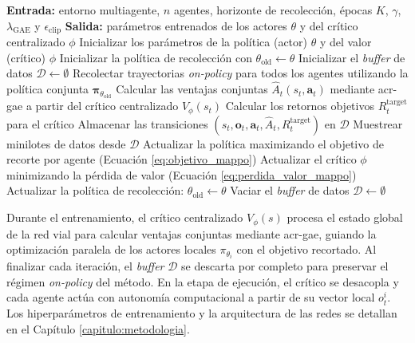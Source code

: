 \begin{algorithm}[!htbp]
\caption{Algoritmo Multi-Agent Proximal Policy Optimization (\acrshort{acr-mappo})}
\label{alg:mappo}
\begin{algorithmic}[1]
\Statex \textbf{Entrada:} entorno multiagente, $n$ agentes, horizonte de recolección, épocas $K$, $\gamma$, $\lambda_{\mathrm{GAE}}$ y $\epsilon_{\mathrm{clip}}$
\Statex \textbf{Salida:} parámetros entrenados de los actores $\theta$ y del crítico centralizado $\phi$
\State Inicializar los parámetros de la política (actor) $\theta$ y del valor (crítico) $\phi$
\State Inicializar la política de recolección con $\theta_{\mathrm{old}} \leftarrow \theta$
\State Inicializar el \textit{buffer} de datos $\mathcal{D} \leftarrow \emptyset$
    \State Recolectar trayectorias \textit{on-policy} para todos los agentes utilizando la política conjunta $\boldsymbol{\pi}_{\theta_{\mathrm{old}}}$
    \State Calcular las ventajas conjuntas $\hat{A}_t(s_t, \mathbf{a}_t)$ mediante \acrshort{acr-gae} a partir del crítico centralizado $V_\phi(s_t)$
    \State Calcular los retornos objetivos $R_t^{\text{target}}$ para el crítico
    \State Almacenar las transiciones $(s_t, \mathbf{o}_t, \mathbf{a}_t, \hat{A}_t, R_t^{\text{target}})$ en $\mathcal{D}$
        \State Muestrear minilotes de datos desde $\mathcal{D}$
        \State Actualizar la política maximizando el objetivo de recorte por agente (Ecuación \eqref{eq:objetivo_mappo})
        \State Actualizar el crítico $\phi$ minimizando la pérdida de valor (Ecuación \eqref{eq:perdida_valor_mappo})
    \EndFor
    \State Actualizar la política de recolección: $\theta_{\mathrm{old}} \leftarrow \theta$
    \State Vaciar el \textit{buffer} de datos $\mathcal{D} \leftarrow \emptyset$
\EndFor
\end{algorithmic}
\end{algorithm}
Durante el entrenamiento, el crítico centralizado $V_\phi(s)$ procesa el estado global de la red vial para calcular ventajas conjuntas mediante \acrshort{acr-gae}, guiando la optimización paralela de los actores locales $\pi_{\theta_i}$ con el objetivo recortado. Al finalizar cada iteración, el \textit{buffer} $\mathcal{D}$ se descarta por completo para preservar el régimen \textit{on-policy} del método. En la etapa de ejecución, el crítico se desacopla y cada agente actúa con autonomía computacional a partir de su vector local $o_t^i$. Los hiperparámetros de entrenamiento y la arquitectura de las redes se detallan en el Capítulo \ref{capitulo:metodologia}.

